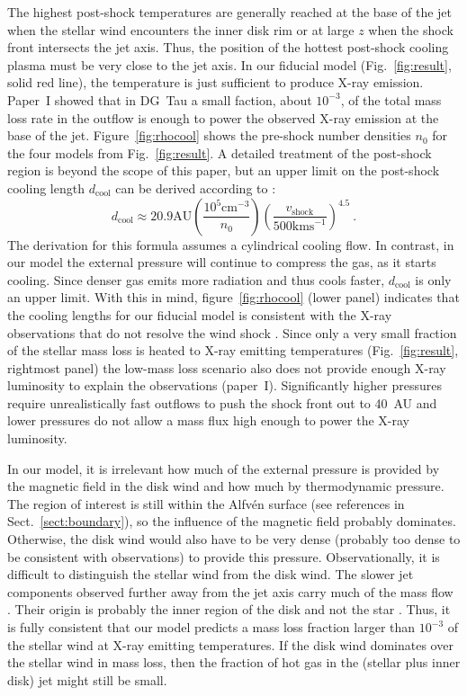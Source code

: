 The highest post-shock temperatures are generally reached at the base of the jet when the stellar wind encounters the inner disk rim or at large $z$ when the shock front intersects the jet axis. Thus, the position of the hottest post-shock cooling plasma must be very close to the jet axis. In our fiducial model (Fig.~\ref{fig:result}, solid red line), the temperature is just sufficient to produce X-ray emission. Paper~I showed that in DG~Tau a small faction, about $10^{-3}$, of the total mass loss rate in the outflow is enough to power the observed X-ray emission at the base of the jet. Figure~\ref{fig:rhocool} shows the pre-shock number densities $n_0$ for the four models from Fig.~\ref{fig:result}. A detailed treatment of the post-shock region is beyond the scope of this paper, but an upper limit on the post-shock cooling length $d_{\mathrm{cool}}$ can be derived according to \citet{2002ApJ...576L.149R}:
\begin{equation}
d_{\mathrm{cool}} \approx 20.9 \mathrm{ AU}
    \left(\frac{10^5\mathrm{ cm}^{-3}}{n_0}\right)
    \left(\frac{v_{\mathrm{shock}}}{500\mathrm{ km s}^{-1}}\right)^{4.5}\ .
\end{equation}
The derivation for this formula assumes a cylindrical cooling flow. In contrast, in our model the external pressure will continue to compress the gas, as it starts cooling. Since denser gas emits more radiation and thus cools faster, $d_{\mathrm{cool}}$ is only an upper limit. With this in mind, figure~\ref{fig:rhocool} (lower panel) indicates that the cooling lengths for our fiducial model is consistent with the X-ray observations that do not resolve the wind shock \citep{2008A&A...488L..13S}. Since only a very small fraction of the stellar mass loss is heated to X-ray emitting temperatures (Fig.~\ref{fig:result}, rightmost panel) the low-mass loss scenario also does not provide enough X-ray luminosity to explain the observations (paper~I).
Significantly higher pressures require unrealistically fast outflows to push the shock front out to 40~AU and lower pressures do not allow a mass flux high enough to power the X-ray luminosity.

In our model, it is irrelevant how much of the external pressure is provided by the magnetic field in the disk wind and how much by thermodynamic pressure. The region of interest is still within the Alfv\'en surface (see references in Sect.~\ref{sect:boundary}), so the influence of the magnetic field probably dominates. Otherwise, the disk wind would also have to be very dense (probably too dense to be consistent with observations) to provide this pressure. Observationally, it is difficult to distinguish the stellar wind from the disk wind. The slower jet components observed further away from the jet axis carry much of the mass flow \citep{2000ApJ...537L..49B}. Their origin is probably the inner region of the disk and not the star \citep{2003ApJ...590L.107A}. Thus, it is fully consistent that our model predicts a mass loss fraction larger than  $10^{-3}$ of the stellar wind at X-ray emitting temperatures. If the disk wind dominates over the stellar wind in mass loss, then the fraction of hot gas in the (stellar plus inner disk) jet might still be small.